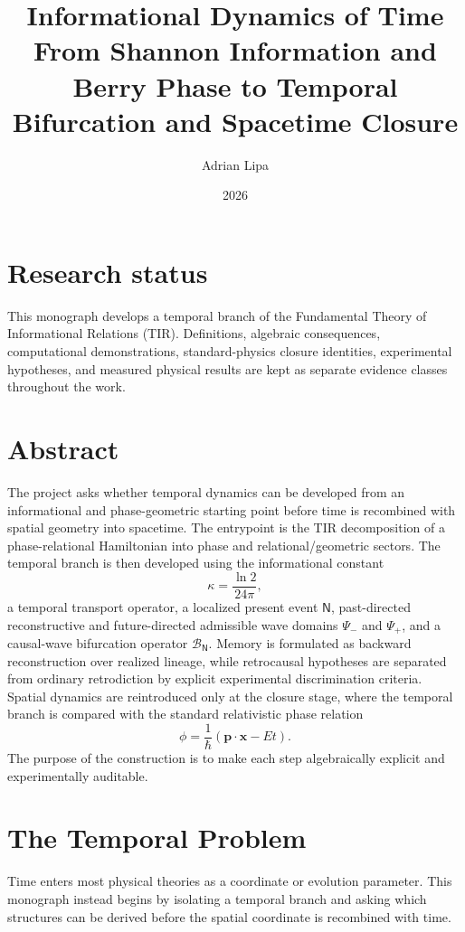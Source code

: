\documentclass[11pt,a4paper]{book}
\title{Informational Dynamics of Time\\[0.6em]
\large From Shannon Information and Berry Phase to Temporal Bifurcation and Spacetime Closure}
\author{Adrian Lipa}
\date{2026}
\newcommand{\kI}{\kappa}
\newcommand{\Now}{\mathsf{N}}
\newcommand{\Past}{\Psi_{-}}
\newcommand{\Future}{\Psi_{+}}
\newcommand{\BN}{\mathcal B_{\Now}}
\begin{document}
\frontmatter
\maketitle

\chapter*{Research status}
This monograph develops a temporal branch of the Fundamental Theory of Informational Relations (TIR). Definitions, algebraic consequences, computational demonstrations, standard-physics closure identities, experimental hypotheses, and measured physical results are kept as separate evidence classes throughout the work.

\chapter*{Abstract}
The project asks whether temporal dynamics can be developed from an informational and phase-geometric starting point before time is recombined with spatial geometry into spacetime. The entrypoint is the TIR decomposition of a phase-relational Hamiltonian into phase and relational/geometric sectors. The temporal branch is then developed using the informational constant
\begin{equation}
\kI=\frac{\ln 2}{24\pi},
\end{equation}
a temporal transport operator, a localized present event $\Now$, past-directed reconstructive and future-directed admissible wave domains $\Past$ and $\Future$, and a causal-wave bifurcation operator $\BN$. Memory is formulated as backward reconstruction over realized lineage, while retrocausal hypotheses are separated from ordinary retrodiction by explicit experimental discrimination criteria. Spatial dynamics are reintroduced only at the closure stage, where the temporal branch is compared with the standard relativistic phase relation
\begin{equation}
\phi=\frac{1}{\hbar}(\mathbf p\cdot\mathbf x-Et).
\end{equation}
The purpose of the construction is to make each step algebraically explicit and experimentally auditable.

\tableofcontents

\mainmatter

\chapter{The Temporal Problem}
Time enters most physical theories as a coordinate or evolution parameter. This monograph instead begins by isolating a temporal branch and asking which structures can be derived before the spatial coordinate is recombined with time.
\end{document}
